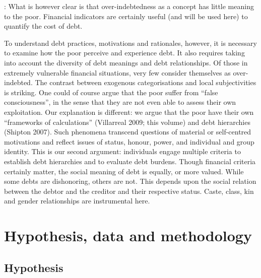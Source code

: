 \documentclass[a4paper, 11pt, onecolumn]{article}
\begin{document}
\cite{Guerin2014a} : What is however clear is that over-indebtedness as a concept has little meaning to the poor.
Financial indicators are certainly useful (and will be used here) to quantify the cost of debt.

To understand debt practices, motivations and rationales, however, it is necessary to examine
how the poor perceive and experience debt. It also requires taking into account the diversity
of debt meanings and debt relationships. Of those in extremely vulnerable financial situations,
very few consider themselves as over-indebted. The contrast between exogenous
categorisations and local subjectivities is striking. One could of course argue that the poor
suffer from “false consciousness”, in the sense that they are not even able to assess their own
exploitation. Our explanation is different: we argue that the poor have their own “frameworks
of calculations” (Villarreal 2009; this volume) and debt hierarchies (Shipton 2007). Such
phenomena transcend questions of material or self-centred motivations and reflect issues of
status, honour, power, and individual and group identity. This is our second argument:
individuals engage multiple criteria to establish debt hierarchies and to evaluate debt burdens.
Though financial criteria certainly matter, the social meaning of debt is equally, or more
valued. While some debts are dishonoring, others are not. This depends upon the social
relation between the debtor and the creditor and their respective status. Caste, class, kin and
gender relationships are instrumental here.


\newpage
\section{Hypothesis, data and methodology}

	\subsection{Hypothesis}
\end{document}
